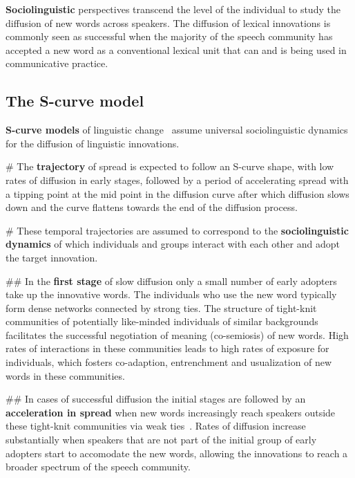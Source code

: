 \documentclass[a4paper]{scrartcl}
\renewcommand{\hw}[1]{\textbf{#1}}
\begin{document}
    \hw{Sociolinguistic} perspectives transcend the level of the individual to study the diffusion of new words across speakers. The diffusion of lexical innovations is commonly seen as successful when the majority of the speech community has accepted a new word as a conventional lexical unit that can and is being used in communicative practice.

  \subsection{The S-curve model}

    \hw{S-curve models} of linguistic change~\parencite{Labov2007,Milroy1992,Nevalainen2015} assume universal sociolinguistic dynamics for the diffusion of linguistic innovations.

    \begin{easylist}[itemize]

      # The \hw{trajectory} of spread is expected to follow an S-curve shape, with low rates of diffusion in early stages, followed by a period of accelerating spread with a tipping point at the mid point in the diffusion curve after which diffusion slows down and the curve flattens towards the end of the diffusion process.

      # These temporal trajectories are assumed to correspond to the \hw{sociolinguistic dynamics} of which individuals and groups interact with each other and adopt the target innovation.

        ## In the \hw{first stage} of slow diffusion only a small number of early adopters take up the innovative words. The individuals who use the new word typically form dense networks connected by strong ties. The structure of tight-knit communities of potentially like-minded individuals of similar backgrounds facilitates the successful negotiation of meaning (co-semiosis) of new words. High rates of interactions in these communities leads to high rates of exposure for individuals, which fosters co-adaption, entrenchment and usualization of new words in these communities.

        ## In cases of successful diffusion the initial stages are followed by an \hw{acceleration in spread} when new words increasingly reach speakers outside these tight-knit communities via weak ties~\parencite{Granovetter1977}. Rates of diffusion increase substantially when speakers that are not part of the initial group of early adopters start to accomodate the new words, allowing the innovations to reach a broader spectrum of the speech community.


\end{easylist}
\end{document}
